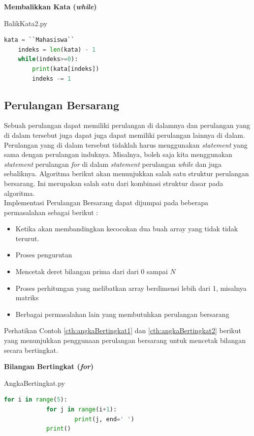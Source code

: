 \begin{contoh}
	\textbf{Membalikkan Kata (\textit{while})}
\begin{listprog}{BalikKata2.py}
\label{lst:BalikKata2}
\begin{lstlisting}[language=Python]
	kata = ``Mahasiswa``
	indeks = len(kata) - 1
	while(indeks>=0):
		print(kata[indeks])
		indeks -= 1
	\end{lstlisting}
\end{listprog}
\end{contoh}


\FloatBarrier
\subsection{Perulangan Bersarang}
Sebuah perulangan dapat memiliki perulangan di dalamnya dan perulangan yang di dalam tersebut juga dapat juga dapat memiliki perulangan lainnya di dalam. Perulangan yang di dalam tersebut tidaklah harus menggunakan \textit{statement} yang sama dengan perulangan induknya. Misalnya, boleh saja kita menggunakan \textit{statement} perulangan \textit{for} di dalam \textit{statement} perulangan \textit{while} dan juga sebaliknya. Algoritma berikut akan menunjukkan salah satu struktur perulangan bersarang. Ini merupakan salah satu dari kombinasi struktur dasar pada algoritma. \\

Implementasi Perulangan Bersarang dapat dijumpai pada beberapa permasalahan sebagai berikut : 
\begin{itemize}
	\item Ketika akan membandingkan kecocokan dua buah array yang tidak tidak terurut. 
	\item Proses pengurutan 
	\item Mencetak deret bilangan prima dari dari 0 sampai $N$
	\item Proses perhitungan yang melibatkan array berdimensi lebih dari 1, misalnya matriks
	\item Berbagai permasalahan lain yang membutuhkan perulangan bersarang
\end{itemize}

Perhatikan Contoh \ref{cth:angkaBertingkat1} dan \ref{cth:angkaBertingkat2} berikut yang menunjukkan penggunaan perulangan bersarang untuk mencetak bilangan secara bertingkat. 

\begin{contoh}
	\textbf{Bilangan Bertingkat (\textit{for})}
	\label{cth:angkaBertingkat1}
\begin{listprog}{AngkaBertingkat.py}
\label{lst:angkaBertingkat}
\begin{lstlisting}[language=Python]
	for i in range(5):
			for j in range(i+1):
					print(j, end=' ')
			print()
	\end{lstlisting}
\end{listprog}
\end{contoh}

